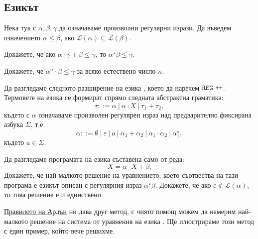 \subsection{Езикът \REGPP}

Нека тук с $\alpha,\beta,\gamma$ да означаваме произволни регулярни изрази.
Да въведем означението $\alpha \leq \beta$, ако $\mathcal{L}(\alpha) \subseteq \mathcal{L}(\beta)$.

\begin{problem}
  Докажете, че ако $\alpha \cdot \gamma + \beta \leq \gamma$, то $\alpha^\star \beta \leq \gamma$.
\end{problem}
\begin{hint}
  Докажете, че $\alpha^n \cdot \beta \leq \gamma$ за всяко естествено число $n$.
\end{hint}

Да разгледаме следното разширение на езика \REG, което да наречем $\texttt{REG}\ \texttt{++}$.
Термовете на езика \REGPP се формират спрямо следната абстрактна граматика:
\[\tau ::= \alpha\ |\ \alpha \cdot X\ |\ \tau_1 + \tau_2,\]
където с $\alpha$ означаваме произволен регулярен израз над предварително фиксирана азбука $\Sigma$, т.е.
\[\alpha ::= \emptyset\ |\ \varepsilon\ |\ a\ |\ \alpha_1 + \alpha_2\ |\ \alpha_1 \cdot \alpha_2\ |\ \alpha^\star_1,\]
където $a \in \Sigma$.

\begin{problem}\label{prob:reg:arden}
  Да разгледаме програмата на езика \REGPP съставена само от реда:
  \[X = \alpha \cdot X + \beta.\]
  Докажете, че най-малкото решение на уравнението, което съотвества на тази програма е езикът описан с регулярния израз
  $\alpha^\star \beta$. Докажете, че ако $\varepsilon \not \in \mathcal{L}(\alpha)$, то това решение е и единствено.
\end{problem}

\hyperref[prob:reg:arden]{Правилото на Ардън} ни дава друг метод, с чиято помощ можем да намерим най-малкото решение на система от уравнения на езика \REG.
Ще илюстрираме този метод с един пример, който вече решихме.

